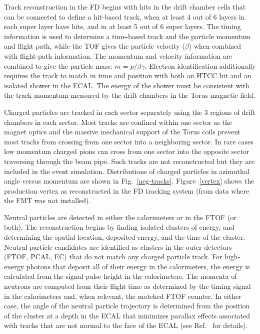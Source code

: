 \documentclass[final,3p,twocolumn]{elsarticle}
\begin{document}
Track reconstruction in the FD begins with hits in the drift chamber cells that can be connected to define a 
hit-based track, when at least 4 out of 6 layers in each super layer have hits, and in at least 5 out of 6 super layers. The
timing information is used to determine a time-based track and the particle momentum and flight path, while the TOF
gives the particle velocity ($\beta$) when combined with flight-path information. The momentum and velocity information
are combined to give the particle mass: $m = p/\beta\gamma$. Electron identification additionally requires the track to
match in time and position with both an HTCC hit and an isolated shower in the ECAL. The energy of the shower must be
consistent with the track momentum measured by the drift chambers in the Torus magnetic field.  

Charged particles are tracked in each sector separately using the 3 regions of drift chambers in each sector. Most
tracks are confined within one sector as the magnet optics and the massive mechanical support of the Torus coils
prevent most tracks from crossing from one sector into a neighboring sector. In rare cases low momentum charged
pions can cross from one sector into the opposite sector traversing through the beam pipe. Such tracks are not
reconstructed but they are included in the event simulation. Distributions of charged particles in azimuthal angle
versus momentum are shown in Fig.~\ref{neg-tracks}. Figure~\ref{vertex} shows the production vertex as reconstructed
in the FD tracking system (from data where the FMT was not installed). 

Neutral particles are detected in either the calorimeters or in the FTOF (or both). The reconstruction begins by finding
isolated clusters of energy, and determining the spatial location, deposited energy, and the time of the cluster. Neutral
particle candidates are identified as clusters in the outer detectors (FTOF, PCAL, EC) that do not match any charged
particle track. For high-energy photons that deposit all of their energy in the calorimeters, the energy is calculated from
the signal pulse height in the calorimeters. The momenta of neutrons are computed from their flight time as determined
by the timing signal in the calorimeters and, when relevant, the matched FTOF counter. In either case, the angle of the
neutral particle trajectory is determined from the position of the cluster at a depth in the ECAL that minimizes
parallax effects associated with tracks that are not normal to the face of the ECAL (see Ref.~\cite{ECAL} for
details).
\end{document}
